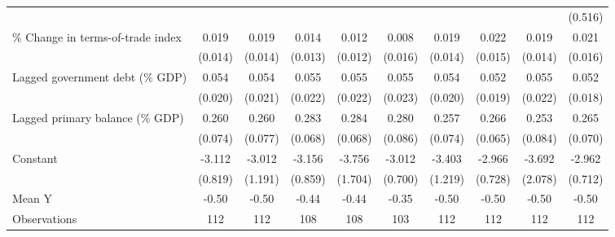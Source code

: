 {\begin{tabular}{l*{9}{c}}
                    &                     &                     &                     &                     &                     &                     &                     &                     &     (0.516)         \\
\addlinespace
\% Change in terms-of-trade index&       0.019         &       0.019         &       0.014         &       0.012         &       0.008         &       0.019         &       0.022         &       0.019         &       0.021         \\
                    &     (0.014)         &     (0.014)         &     (0.013)         &     (0.012)         &     (0.016)         &     (0.014)         &     (0.015)         &     (0.014)         &     (0.016)         \\
\addlinespace
Lagged government debt (\% GDP)&       0.054\sym{**} &       0.054\sym{**} &       0.055\sym{**} &       0.055\sym{**} &       0.055\sym{**} &       0.054\sym{**} &       0.052\sym{**} &       0.055\sym{**} &       0.052\sym{**} \\
                    &     (0.020)         &     (0.021)         &     (0.022)         &     (0.022)         &     (0.023)         &     (0.020)         &     (0.019)         &     (0.022)         &     (0.018)         \\
\addlinespace
Lagged primary balance (\% GDP)&       0.260\sym{***}&       0.260\sym{***}&       0.283\sym{***}&       0.284\sym{***}&       0.280\sym{***}&       0.257\sym{***}&       0.266\sym{***}&       0.253\sym{***}&       0.265\sym{***}\\
                    &     (0.074)         &     (0.077)         &     (0.068)         &     (0.068)         &     (0.086)         &     (0.074)         &     (0.065)         &     (0.084)         &     (0.070)         \\
\addlinespace
Constant            &      -3.112\sym{***}&      -3.012\sym{**} &      -3.156\sym{***}&      -3.756\sym{**} &      -3.012\sym{***}&      -3.403\sym{**} &      -2.966\sym{***}&      -3.692\sym{*}  &      -2.962\sym{***}\\
                    &     (0.819)         &     (1.191)         &     (0.859)         &     (1.704)         &     (0.700)         &     (1.219)         &     (0.728)         &     (2.078)         &     (0.712)         \\
\midrule
Mean Y              &       -0.50         &       -0.50         &       -0.44         &       -0.44         &       -0.35         &       -0.50         &       -0.50         &       -0.50         &       -0.50         \\
Observations        &         112         &         112         &         108         &         108         &         103         &         112         &         112         &         112         &         112         \\
\bottomrule
\end{tabular}
}
